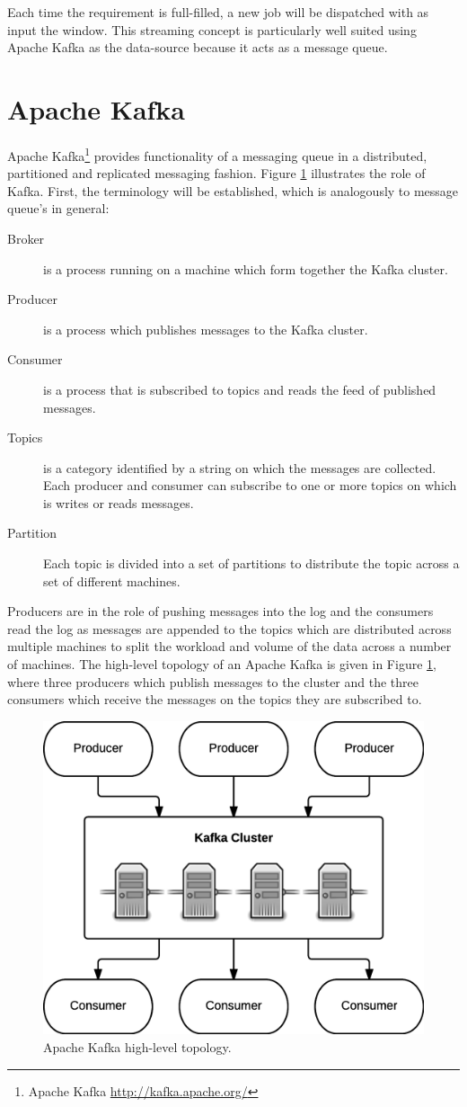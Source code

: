 Each time the requirement is full-filled, a new job will be dispatched with as input the window. This streaming concept is particularly well suited using Apache Kafka as the data-source because it acts as a message queue.

\section{Apache Kafka \label{subsec_kafka}}

Apache Kafka\footnote{Apache Kafka \url{http://kafka.apache.org/}} provides functionality of a messaging queue in a distributed, partitioned and replicated messaging fashion. Figure \ref{fig:kafka} illustrates the role of Kafka. First, the terminology will be established, which is analogously to message queue's in general:

\begin{description}
    \item[Broker] is a process running on a machine which form together the Kafka cluster. 
    \item[Producer] is a process which publishes messages to the Kafka cluster.
    \item[Consumer] is a process that is subscribed to topics and reads the feed of published messages.
    \item[Topics] is a category identified by a string on which the messages are collected. Each producer and consumer can subscribe to one or more topics on which is writes or reads messages.
    \item[Partition] Each topic is divided into a set of partitions to distribute the topic across a set of different machines.
\end{description}

Producers are in the role of pushing messages into the log and the consumers read the log as messages are appended to the topics which are distributed across multiple machines to split the workload and volume of the data across a number of machines. The high-level topology of an Apache Kafka is given in Figure \ref{fig:kafka}, where three producers which publish messages to the cluster and the three consumers which receive the messages on the topics they are subscribed to.

\begin{figure}[ht!]
\centering
\includegraphics[width=.7\textwidth]{figures/kafka.png}
\caption{Apache Kafka high-level topology. \label{fig:kafka}}
\end{figure}

